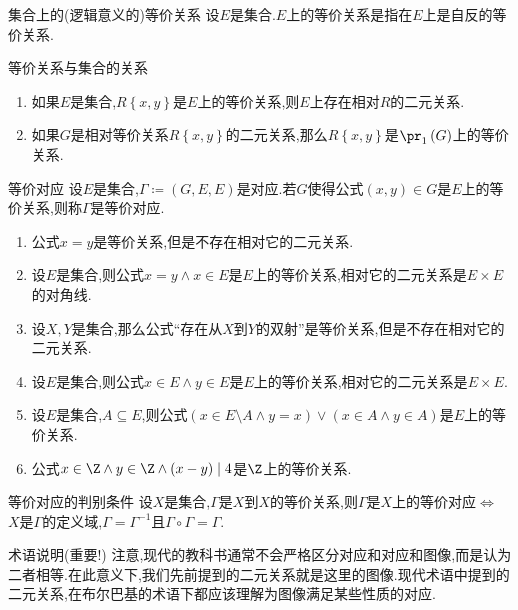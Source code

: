 \begin{definition}{集合上的(逻辑意义的)等价关系}{}
	设$E$是集合.$E$上的等价关系是指在$E$上是自反的等价关系.
\end{definition}

\begin{proposition}{等价关系与集合的关系}{}
	\begin{enumerate}
		\item 如果$E$是集合,$R\left\{x,y\right\}$是$E$上的等价关系,则$E$上存在相对$R$的二元关系.
		\item 如果$G$是相对等价关系$R\left\{x,y\right\}$的二元关系,那么$R\left\{x,y\right\}$是$\pr_{1}\left(G\right)$上的等价关系.
	\end{enumerate}
\end{proposition}

\begin{definition}{等价对应}{}
	设$E$是集合,$\Gamma\coloneq\left(G,E,E\right)$是对应.若$G$使得公式$\left(x,y\right)\in G$是$E$上的等价关系,则称$\Gamma$是等价对应.
\end{definition}

\begin{example}{}{}
	\begin{enumerate}
		\item 公式$x=y$是等价关系,但是不存在相对它的二元关系.
		\item 设$E$是集合,则公式$x=y\wedge x\in E$是$E$上的等价关系,相对它的二元关系是$E\times E$的对角线.
		\item 设$X,Y$是集合,那么公式``存在从$X$到$Y$的双射''是等价关系,但是不存在相对它的二元关系.
		\item 设$E$是集合,则公式$x\in E\wedge y\in E$是$E$上的等价关系,相对它的二元关系是$E\times E$.
		\item 设$E$是集合,$A\subseteq E$,则公式$\left(x\in E\setminus A\wedge y=x\right)\vee\left(x\in A\wedge y\in A\right)$是$E$上的等价关系.
		\item 公式$x\in\Z\wedge y\in\Z\wedge \left(x-y\right)\mid 4$是$\Z$上的等价关系.
	\end{enumerate}
\end{example}

\begin{proposition}{等价对应的判别条件}{}
	设$X$是集合,$\Gamma$是$X$到$X$的等价关系,则$\Gamma$是$X$上的等价对应$\iff$ $X$是$\Gamma$的定义域,$\Gamma=\Gamma^{-1}$且$\Gamma\circ\Gamma=\Gamma$.
\end{proposition}

\begin{remark}{术语说明(重要!)}{}
	注意,现代的教科书通常不会严格区分对应和对应和图像,而是认为二者相等.在此意义下,我们先前提到的二元关系就是这里的图像.现代术语中提到的二元关系,在布尔巴基的术语下都应该理解为图像满足某些性质的对应.
\end{remark}



























